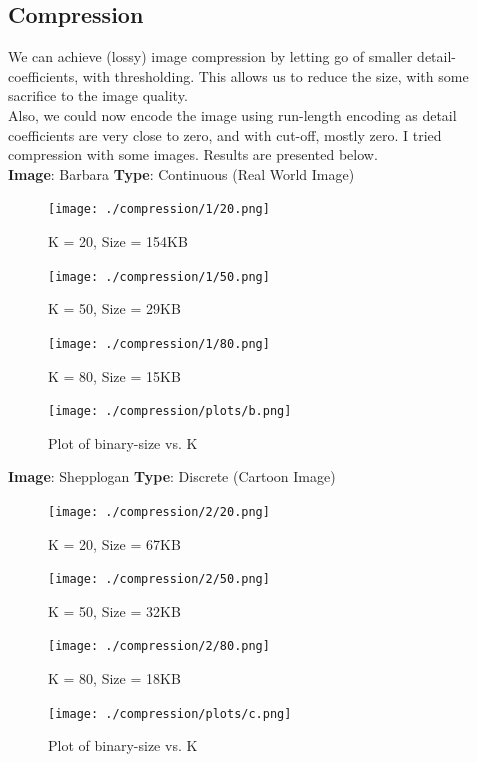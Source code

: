 \documentclass{article}
\begin{document}
    \subsection*{Compression}
    We can achieve (lossy) image compression by letting go of smaller detail-coefficients, with thresholding. This allows us to reduce the size, with some sacrifice to the image quality.
    \\Also, we could now encode the image using run-length encoding as detail coefficients are very close to zero, and with cut-off, mostly zero. I tried compression with some images. Results are presented below.\\[2pt]
    \textbf{Image}: Barbara  \textbf{Type}: Continuous (Real World Image)\\
    \begin{figure}[!htb]
      \texttt{[image: ./compression/1/20.png]}
      \caption{K = 20, Size = 154KB}
    \endminipage \hfill
      \texttt{[image: ./compression/1/50.png]}
      \caption{K = 50, Size = 29KB}
    \endminipage
    \end{figure}
    

    \begin{figure}[!htb]
      \texttt{[image: ./compression/1/80.png]}
      \caption{K = 80, Size = 15KB}
    \endminipage \hfill
      \texttt{[image: ./compression/plots/b.png]}
      \caption{Plot of binary-size vs. K}
    \endminipage
    \end{figure}
    
    \pagebreak
    \textbf{Image}: Shepplogan  \textbf{Type}: Discrete (Cartoon Image)\\
    \begin{figure}[!htb]
      \texttt{[image: ./compression/2/20.png]}
      \caption{K = 20, Size = 67KB}
    \endminipage \hfill
      \texttt{[image: ./compression/2/50.png]}
      \caption{K = 50, Size = 32KB}
    \endminipage
    \end{figure}
    

    \begin{figure}[!htb]
      \texttt{[image: ./compression/2/80.png]}
      \caption{K = 80, Size = 18KB}
    \endminipage \hfill
      \texttt{[image: ./compression/plots/c.png]}
      \caption{Plot of binary-size vs. K}
    \endminipage
    \end{figure}
\end{document}

